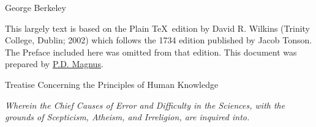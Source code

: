 \documentclass[]{article}
\newcommand*{\authortitle}[1]{\medskip\centerline{\Huge\sc #1}\bigskip}
\newcommand*{\itemtitle}[1]{\setstretch{1.8}\pagebreak[2]\begin{center}{\LARGE\sc #1}\end{center}\setstretch{1.2}}
\newcommand*{\itemsubtitle}[1]{\begin{center}\emph{#1}\end{center}}
\begin{document}

\authortitle{George Berkeley}



\noindent
This largely text is based on the Plain \TeX\ edition by David R. Wilkins (Trinity College, Dublin; 2002) which follows the 1734 edition published by Jacob Tonson. The Preface included here was omitted from that edition. This document was prepared by \href{https://www.fecundity.com}{P.D. Magnus}.
\itemtitle{Treatise Concerning the Principles of Human Knowledge}
\itemsubtitle{Wherein the Chief Causes of Error and Difficulty in the Sciences, with the grounds of Scepticism, Atheism, and Irreligion, are inquired into.}



\setcounter{tocdepth}{1}
\tableofcontents

\pagestyle{fancy}
\lfoot{\thepage}
\cfoot{}


\bigskip
\end{document}
